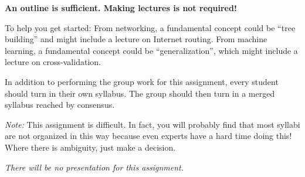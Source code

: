 \documentclass[11pt]{article}
\begin{document}
{\bf An outline is sufficient.  Making lectures is not required!}

To help you get started: From networking, a fundamental concept could be
``tree building'' and might include a lecture on Internet routing.  From
machine learning, a fundamental concept could be ``generalization'',
which might include a lecture on cross-validation.

In addition to performing the group work for this assignment, every
student should turn in their own syllabus.  The group should then turn
in a merged syllabus reached by consensus.

{\em Note:} This assignment is difficult.  In fact, you will probably
find that most syllabi are not organized in this way because even
experts have a hard time doing this!  Where there is ambiguity, just
make a decision.

{\em There will be no presentation for this assignment.}
\end{document}
